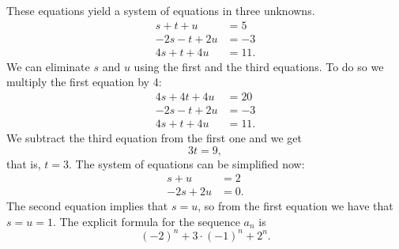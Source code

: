 These equations yield a system of equations in three unknowns.
\begin{align*}
s+t+u&=5\\
-2s-t+2u&=-3\\
4s+t+4u&=11.
\end{align*}
We can eliminate $s$ and $u$ using the first and the third equations. To do so we multiply the first equation by 4:
\begin{align*}
4s+4t+4u&=20\\
-2s-t+2u&=-3\\
4s+t+4u&=11.
\end{align*}
We subtract the third equation from the first one and we get
$$
3t=9,
$$
that is, $t=3$. The system of equations can be simplified now:
\begin{align*}
s+u&=2\\
-2s+2u&=0.
\end{align*}
The second equation implies that $s=u$, so from the first equation we have that $s=u=1$.
The explicit formula for the sequence $a_n$ is
$$
(-2)^n+3\cdot (-1)^n+2^n.
$$

